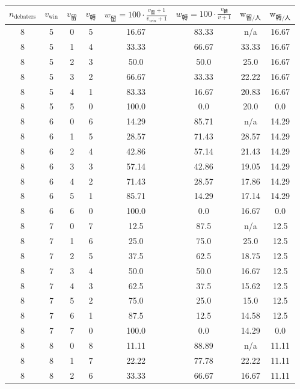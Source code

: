 \begin{table}[h]
    \centering
    \small
    \begin{threeparttable}
    \begin{tabular}{cccccccc}
    \toprule
    $n_{\text{debaters}}$ & $v_{\text{win}}$ & $v_{\text{留}}$ & $v_{\text{轉}}$ & $w_{\text{留}} = 100 \cdot \frac{v_{\text{留}}+1}{v_{win}+1} $ & $w_{\text{轉}} = 100\cdot\frac{v_{\text{轉}}}{v+1}$ & $\text{w}_{\text{留}/\text{人} }$ & $\text{w}_{\text{轉}/\text{人}}$ \\
    \midrule
8 & 5 & 0 & 5 & 16.67 & 83.33 & n/a\tnote{a} & 16.67 \\
8 & 5 & 1 & 4 & 33.33 & 66.67 & 33.33 & 16.67 \\
8 & 5 & 2 & 3 & 50.0 & 50.0 & 25.0 & 16.67 \\
8 & 5 & 3 & 2 & 66.67 & 33.33 & 22.22 & 16.67 \\
8 & 5 & 4 & 1 & 83.33 & 16.67 & 20.83 & 16.67 \\
8 & 5 & 5 & 0 & 100.0 & 0.0 & 20.0 & 0.0 \\
8 & 6 & 0 & 6 & 14.29 & 85.71 & n/a\tnote{a} & 14.29 \\
8 & 6 & 1 & 5 & 28.57 & 71.43 & 28.57 & 14.29 \\
8 & 6 & 2 & 4 & 42.86 & 57.14 & 21.43 & 14.29 \\
8 & 6 & 3 & 3 & 57.14 & 42.86 & 19.05 & 14.29 \\
8 & 6 & 4 & 2 & 71.43 & 28.57 & 17.86 & 14.29 \\
8 & 6 & 5 & 1 & 85.71 & 14.29 & 17.14 & 14.29 \\
8 & 6 & 6 & 0 & 100.0 & 0.0 & 16.67 & 0.0 \\
8 & 7 & 0 & 7 & 12.5 & 87.5 & n/a\tnote{a} & 12.5 \\
8 & 7 & 1 & 6 & 25.0 & 75.0 & 25.0 & 12.5 \\
8 & 7 & 2 & 5 & 37.5 & 62.5 & 18.75 & 12.5 \\
8 & 7 & 3 & 4 & 50.0 & 50.0 & 16.67 & 12.5 \\
8 & 7 & 4 & 3 & 62.5 & 37.5 & 15.62 & 12.5 \\
8 & 7 & 5 & 2 & 75.0 & 25.0 & 15.0 & 12.5 \\
8 & 7 & 6 & 1 & 87.5 & 12.5 & 14.58 & 12.5 \\
8 & 7 & 7 & 0 & 100.0 & 0.0 & 14.29 & 0.0 \\
8 & 8 & 0 & 8 & 11.11 & 88.89 & n/a\tnote{a} & 11.11 \\
8 & 8 & 1 & 7 & 22.22 & 77.78 & 22.22 & 11.11 \\
8 & 8 & 2 & 6 & 33.33 & 66.67 & 16.67 & 11.11 \\

\end{tabular}
\end{threeparttable}
\end{table}
